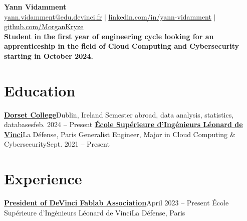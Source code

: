 \documentclass[letterpaper,11pt]{article}
\begin{document}
\begin{center}
  \textbf{\Huge Yann Vidamment} \\ \vspace{1pt}
  \href{mailto:yann.vidamment@edu.devinci.fr}{\underline{yann.vidamment@edu.devinci.fr}} $|$ 
  \href{https://linkedin.com/in/yann-vidamment-80a512254/}{\underline{linkedin.com/in/yann-vidamment}} $|$
  \href{https://github.com/MorganKryze}{\underline{github.com/MorganKryze}}\\
  \vspace{6pt}
  \textbf{\small{Student in the first year of engineering cycle looking for an apprenticeship in the field of Cloud Computing and Cybersecurity starting in October 2024.}}
\end{center}

\section{Education}
  \resumeSubHeadingListStart
    \resumeSubheading
      {\href{https://dorset.ie/}{\textbf{Dorset College}}}{Dublin, Ireland}
      {Semester abroad, data analysis, statistics, databases}{feb. 2024 -- Present}
    \resumeSubheading
      {\href{https://www.esilv.fr/}{\textbf{École Supérieure d'Ingénieurs Léonard de Vinci}}}{La Défense, Paris}
      {Generalist Engineer, Major in Cloud Computing \& Cybersecurity}{Sept. 2021 -- Present}
  \resumeSubHeadingListEnd

\section{Experience}
  \resumeSubHeadingListStart
    \resumeSubheading
      {\href{https://dvic.devinci.fr/fablab/}{\textbf{President of DeVinci Fablab Association}}}{April 2023 -- Present}
      {École Supérieure d'Ingénieurs Léonard de Vinci}{La Défense, Paris}
      \resumeItemListStart
      \resumeItemListEnd
\end{document}
